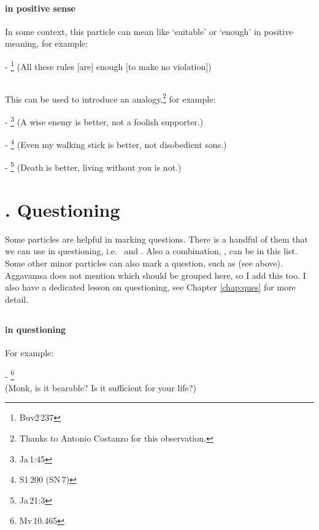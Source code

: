\paragraph*{ in positive sense} In some context, this particle can mean like `suitable' or `enough' in positive meaning, for example:\par
- \footnote{Buv2\,237} (All these rules [are] enough [to make no violation]) \par

\subsection*{}\label{nip:yaynce}
This can be used to introduce an analogy,\footnote{Thanks to Antonio Costanzo for this observation.} for example:\par
- \footnote{Ja\,1:45} (A wise enemy is better, not a foolish supporter.) \par
- \footnote{S1\,200 (SN\,7)} (Even my walking stick is better, not disobedient sons.) \par
- \footnote{Ja\,21:3} (Death is better, living without you is not.) \par

\label{nipgrp4}
\section*{. Questioning}\label{nip:ques}

Some particles are helpful in marking questions. There is a handful of them that we can use in questioning, i.e.\  and . Also a combination, , can be in this list. Some other minor particles can also mark a question, such as  (see above). Aggava\d msa does not mention  which should be grouped here, so I add this too. I also have a dedicated lesson on questioning, see Chapter \ref{chap:ques} for more detail.

\subsection*{}\label{nip:kacci}
\paragraph*{ in questioning} For example:\par
- \footnote{Mv\,10.465} \\(Monk, is it bearable? Is it sufficient for your life?) \par

